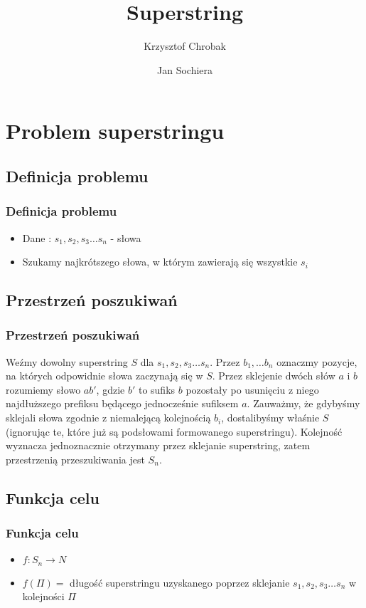 \documentclass[10pt]{beamer}
\title{Superstring}
\author{Krzysztof Chrobak\and Jan Sochiera}
\institute{Algorytmy Ewolucyjne 2012/2013}
\begin{document}
  \frame
  {
    \titlepage
  }

  \section{Problem superstringu}
  \subsection{Definicja problemu}
  \frame
  {
    \frametitle{Definicja problemu}

    \begin{itemize}
	    \item<1-> Dane : $s_1, s_2, s_3 \ldots s_n$ - słowa
	    \item<2-> Szukamy najkrótszego słowa, w którym zawierają się wszystkie $s_i$
    \end{itemize}
  }

  \subsection{Przestrzeń poszukiwań}
  \frame
	{
    \frametitle{Przestrzeń poszukiwań}
    Weźmy dowolny superstring $S$ dla $s_1, s_2, s_3 \ldots s_n$. Przez $b_1, \ldots b_n$ oznaczmy 
    pozycje, na których odpowidnie słowa zaczynają się w $S$. Przez sklejenie dwóch słów $a$ i $b$
    rozumiemy słowo $ab'$, gdzie $b'$ to sufiks $b$ pozostały po usunięciu z niego najdłuższego prefiksu
    będącego jednocześnie sufiksem $a$. Zauważmy, że gdybyśmy sklejali słowa zgodnie z niemalejącą 
    kolejnością $b_i$, dostalibyśmy właśnie $S$ (ignorując te, które już są podsłowami formowanego superstringu). 
    Kolejność wyznacza jednoznacznie otrzymany przez sklejanie
    superstring, zatem przestrzenią przeszukiwania jest $S_n$.
	}

  \subsection{Funkcja celu}
  \frame
	{
	  \frametitle{Funkcja celu}
    \begin{itemize}
      \item <1-> $f : S_n \rightarrow N$
      \item <2-> $f(\Pi) = $ długość superstringu uzyskanego poprzez sklejanie 
          $s_1, s_2, s_3 \ldots s_n$ w kolejności $\Pi$
    \end{itemize}
	}
\end{document}
